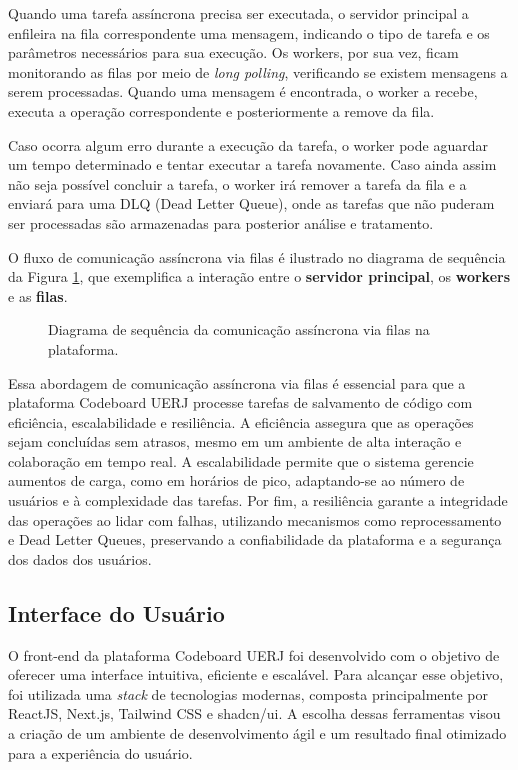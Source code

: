 Quando uma tarefa assíncrona precisa ser executada, o servidor principal a enfileira na fila correspondente uma mensagem, indicando o tipo de tarefa e os parâmetros necessários para sua execução. Os workers, por sua vez, ficam monitorando as filas por meio de \emph{long polling}, verificando se existem mensagens a serem processadas. Quando uma mensagem é encontrada, o worker a recebe, executa a operação correspondente e posteriormente a remove da fila.

Caso ocorra algum erro durante a execução da tarefa, o worker pode aguardar um tempo determinado e tentar executar a tarefa novamente. Caso ainda assim não seja possível concluir a tarefa, o worker irá remover a tarefa da fila e a enviará para uma DLQ (Dead Letter Queue), onde as tarefas que não puderam ser processadas são armazenadas para posterior análise e tratamento.

O fluxo de comunicação assíncrona via filas é ilustrado no diagrama de sequência da Figura \ref{fig:queue-flow}, que exemplifica a interação entre o \textbf{servidor principal}, os \textbf{workers} e as \textbf{filas}.

\begin{figure}[H]
    \centering
    \caption{Diagrama de sequência da comunicação assíncrona via filas na plataforma.}
    \label{fig:queue-flow}
\end{figure}

Essa abordagem de comunicação assíncrona via filas é essencial para que a plataforma Codeboard UERJ processe tarefas de salvamento de código com eficiência, escalabilidade e resiliência. A eficiência assegura que as operações sejam concluídas sem atrasos, mesmo em um ambiente de alta interação e colaboração em tempo real. A escalabilidade permite que o sistema gerencie aumentos de carga, como em horários de pico, adaptando-se ao número de usuários e à complexidade das tarefas. Por fim, a resiliência garante a integridade das operações ao lidar com falhas, utilizando mecanismos como reprocessamento e Dead Letter Queues, preservando a confiabilidade da plataforma e a segurança dos dados dos usuários.


\subsection{Interface do Usuário}

O front-end da plataforma Codeboard UERJ foi desenvolvido com o objetivo de oferecer uma interface intuitiva, eficiente e escalável. Para alcançar esse objetivo, foi utilizada uma \emph{stack} de tecnologias modernas, composta principalmente por ReactJS, Next.js, Tailwind CSS e shadcn/ui. A escolha dessas ferramentas visou a criação de um ambiente de desenvolvimento ágil e um resultado final otimizado para a experiência do usuário.

